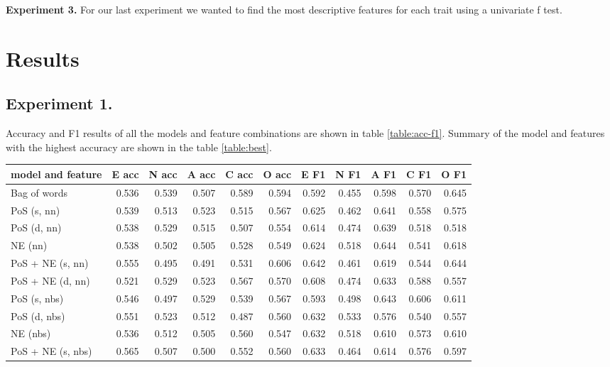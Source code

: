 \documentclass[10pt, a4paper]{article}
\begin{document}
\textbf{Experiment 3.} For our last experiment we wanted to find the most descriptive features for each trait using a univariate f test.

\section{Results}

\subsection{Experiment 1.}
Accuracy and F1 results of all the models and feature combinations are shown in table \ref{table:acc-f1}.
Summary of the model and features with the highest accuracy are shown in the table \ref{table:best}.

\begin{table}
  \begin{center}
  \begin{tabular}{lrrrrrrrrrr}
    \toprule
    model and feature  &  E acc &  N acc &  A acc &  C acc &  O acc &   E F1 &   N F1 &   A F1 &   C F1 &   O F1\\
    \midrule
          Bag of words &  0.536 &  0.539 &  0.507 &  0.589 &  0.594 &  0.592 &  0.455 &  0.598 &  0.570 &  0.645\\
           PoS (s, nn) &  0.539 &  0.513 &  0.523 &  0.515 &  0.567 &  0.625 &  0.462 &  0.641 &  0.558 &  0.575\\
           PoS (d, nn) &  0.538 &  0.529 &  0.515 &  0.507 &  0.554 &  0.614 &  0.474 &  0.639 &  0.518 &  0.518\\
               NE (nn) &  0.538 &  0.502 &  0.505 &  0.528 &  0.549 &  0.624 &  0.518 &  0.644 &  0.541 &  0.618\\
      PoS + NE (s, nn) &  0.555 &  0.495 &  0.491 &  0.531 &  0.606 &  0.642 &  0.461 &  0.619 &  0.544 &  0.644\\
      PoS + NE (d, nn) &  0.521 &  0.529 &  0.523 &  0.567 &  0.570 &  0.608 &  0.474 &  0.633 &  0.588 &  0.557\\
          PoS (s, nbs) &  0.546 &  0.497 &  0.529 &  0.539 &  0.567 &  0.593 &  0.498 &  0.643 &  0.606 &  0.611\\
          PoS (d, nbs) &  0.551 &  0.523 &  0.512 &  0.487 &  0.560 &  0.632 &  0.533 &  0.576 &  0.540 &  0.557\\
              NE (nbs) &  0.536 &  0.512 &  0.505 &  0.560 &  0.547 &  0.632 &  0.518 &  0.610 &  0.573 &  0.610\\
     PoS + NE (s, nbs) &  0.565 &  0.507 &  0.500 &  0.552 &  0.560 &  0.633 &  0.464 &  0.614 &  0.576 &  0.597\\

\end{tabular}
\end{center}
\end{table}
\end{document}
